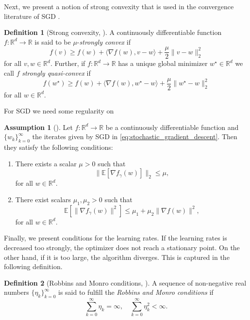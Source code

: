 \documentclass[12pt]{article}
\theoremstyle{definition}
\newtheorem{definition}[definition]{Definition}
\newtheorem{assumption}[assumption]{Assumption}
\numberwithin{equation}{section}
\newcommand{\R}{\mathbb{R}}
\newcommand{\ev}[1]{\mathbb{E}\left[{#1}\right]}
\newcommand{\norm}[1]{\lVert{#1}\rVert_2}
\begin{document}
Next, we present a notion of strong convexity that is used in the convergence literature of SGD \autocite{sebbouhAlmostSureConvergence2021,moulinesNonAsymptoticAnalysisStochastic2011,bottouOptimizationMethodsLargeScale2018}. 
\begin{definition}[Strong convexity, ]
  A continuously differentiable function $f : \mathbb{R}^d \rightarrow \mathbb{R}$ is said to be $\mu$-\emph{strongly convex} if
  \begin{equation*}
    f(v) \geq f(w) + \langle \nabla f(w), v - w \rangle + \frac{\mu}{2} \norm{v - w}^2
  \end{equation*}
  for all $v, w \in \mathbb{R}^d$. Further, if $f : \R^d \rightarrow \R$ has a unique global minimizer $w^\star \in \R^d$ we call $f$ \emph{strongly quasi-convex} if
  \begin{equation*}
    f(w^\star) \geq f(w) + \langle \nabla f(w), w^\star - w \rangle + \frac{\mu}{2} \norm{w^\star - w}^2
  \end{equation*}
  for all $w \in \R^d$.
\end{definition}
For SGD we need some regularity on 


\begin{assumption}[]
  \label{as:sgd_convergence}
  Let $f : \R^d \rightarrow \R$ be a continuously differentiable function and $\{w_k\}_{k=0}^\infty$ the iterates given by SGD in \eqref{eq:stochastic_gradient_descent}. Then they satisfy the following conditions:
  \begin{enumerate}[label=(\roman*)]
    \item There exists a scalar $\mu > 0$ such that 
    \begin{equation*}
      \norm{\ev{\nabla f_{\gamma}(w)}} \leq \mu,
    \end{equation*}
    for all $w \in \R^d$.
    \item There exist scalars $\mu_1, \mu_2 > 0$ such that 
    \begin{equation*}
      \label{eq:variance_linear_growth}
      \ev{\lVert \nabla f_{\gamma}(w) \rVert^2} \leq \mu_1 + \mu_2 \lVert \nabla f(w) \rVert^2,
    \end{equation*}
    for all $w \in \R^d$.
  \end{enumerate}
\end{assumption}

Finally, we present conditions for the learning rates. If the learning rates is decreased too strongly, the optimizer does not reach a stationary point. On the other hand, if it is too large, the algorithm diverges. This is captured in the following definition.
\begin{definition}[Robbins and Monro conditions, \cite{robbinsStochasticApproximationMethod1951}]
  A sequence of non-negative real numbers $\{\eta_k\}_{k=0}^\infty$ is said to fulfill the \emph{Robbins and Monro conditions} if
  \begin{equation*}
    \sum_{k=0}^\infty \eta_k = \infty, \quad \sum_{k=0}^\infty \eta_k^2 < \infty.
  \end{equation*}
\end{definition}
\end{document}

